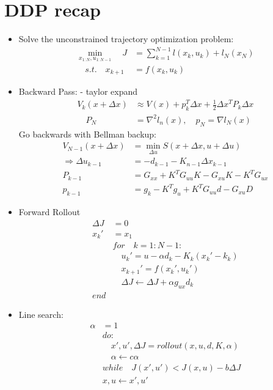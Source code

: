 \documentclass[11pt]{article}
\begin{document}
\section{DDP recap}
\begin{itemize}
    \item Solve the unconstrained trajectory optimization problem:
    \begin{align*}
        \min_{x_{1:N},u_{1:N-1}}\quad J &= \sum_{k=1}^{N-1}l(x_k,u_k) + l_N(x_N)
        \\
        \quad s.t.\quad x_{k+1} &= f(x_k,u_k)
    \end{align*}
    \item Backward Pass: - taylor expand
    \begin{align*}
        V_k(x+\Delta x) &\approx V(x) + p_k^T\Delta x + \frac{1}{2}\Delta x^TP_k\Delta x
        \\
        \quad P_N &= \nabla^2 l_n(x), \quad p_N =\nabla l_N(x)
    \end{align*}
    Go backwards with Bellman backup:
    \begin{align*}
        V_{N-1}(x + \Delta x) &= \min_{\Delta u} S(x+\Delta x, u + \Delta u)
        \\
        \Rightarrow \Delta u_{k-1} &= -d_{k-1} - K_{n-1}\Delta x_{k-1} 
        \\
        P_{k-1} &= G_{xx} + K^T G_{uu}K - G_{xu}K - K^T G_{ux}
        \\
        p_{k-1} &= g_k - K^Tg_u + K^T G_{uu}d  - G_{xu}D
    \end{align*}
    \item Forward Rollout
    \begin{align*}
        \Delta J &= 0 
        \\
        x_k' &= x_1
        \\
        &for \quad k=1:N-1:
        \\
        &\quad u_k' = u-\alpha d_k - K_k(x_k'-k_k)
        \\
        &\quad x_{k+1}' = f(x_k', u_k')
        \\
        &\quad \Delta J \leftarrow \Delta J + \alpha g_{ux}d_k
        \\
        end
    \end{align*}
    \item Line search:
    \begin{align*}
        \alpha &=1 
        \\
        & do: \\
       &\quad x',u',\Delta J = rollout(x,u,d,K,\alpha)
       \\
       &\quad \alpha \leftarrow c\alpha
       \\
       &while \quad J(x',u') < J(x,u) - b\Delta J
       \\
       & x,u \leftarrow x',u'
    \end{align*}
\end{itemize}
\end{document}
